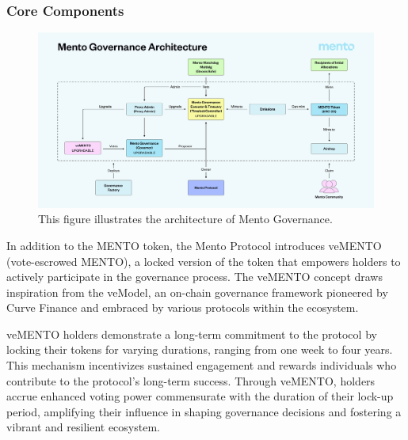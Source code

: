 \documentclass[a4paper]{article}
\theoremstyle{definition}
\begin{document}
\subsubsection{Core Components}
\begin{figure}[ht]
    \centering
    \includegraphics[width=1\linewidth]{figures/mento_governance.png}
    \caption{This figure illustrates the architecture of Mento Governance.}
    \label{fig:mento_governance}
\end{figure}
In addition to the MENTO token, the Mento Protocol introduces veMENTO (vote-escrowed MENTO), a locked version of the token that empowers holders to actively participate in the governance process. The veMENTO concept draws inspiration from the veModel, an on-chain governance framework pioneered by Curve Finance and embraced by various protocols within the ecosystem.

veMENTO holders demonstrate a long-term commitment to the protocol by locking their tokens for varying durations, ranging from one week to four years. This mechanism incentivizes sustained engagement and rewards individuals who contribute to the protocol's long-term success. Through veMENTO, holders accrue enhanced voting power commensurate with the duration of their lock-up period, amplifying their influence in shaping governance decisions and fostering a vibrant and resilient ecosystem.
\end{document}
